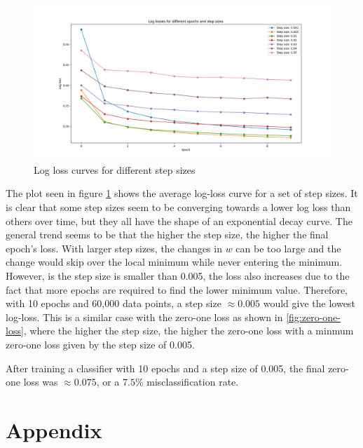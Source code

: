 \documentclass{exam}
\begin{document}
\begin{questions}
\begin{parts}
        \begin{figure}[!ht]
            \centering
            \includegraphics[width=0.70\paperwidth]{images/plot1.png}
            \caption{Log loss curves for different step sizes}
            \label{fig:log-loss}
        \end{figure}

        The plot seen in figure \ref{fig:log-loss} shows the average log-loss curve for a set of step sizes. It is clear that some step sizes seem to be converging towards a lower log loss than others over time, but they all
        have the shape of an exponential decay curve. The general trend seems to be that the higher the step size, the higher the final epoch's loss. With larger step sizes, the changes in $w$ can be too large and the change would
        skip over the local minimum while never entering the minimum. However, is the step size is smaller than 0.005, the loss also increases due to the fact that more epochs are required to find the lower minimum value. Therefore,
        with 10 epochs and 60,000 data points, a step size $\approx 0.005$ would give the lowest log-loss. This is a similar case with the zero-one loss as shown in \ref{fig:zero-one-loss}, where the higher the step size, the higher
        the zero-one loss with a minmum zero-one loss given by the step size of 0.005.

        After training a classifier with 10 epochs and a step size of 0.005, the final zero-one loss was $\approx 0.075$, or a $7.5\%$ misclassification rate.

    \end{parts}
\end{questions}

\newpage
\section*{Appendix}
\end{document}
